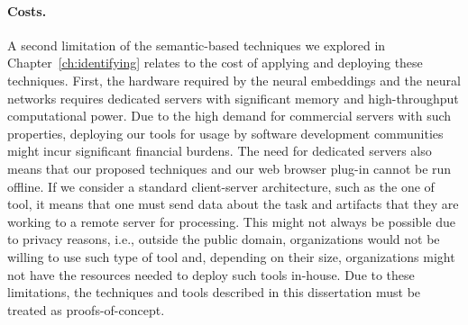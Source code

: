 \paragraph{\textbf{Costs.}}


A second limitation of the semantic-based techniques we explored in Chapter~\ref{ch:identifying}
relates to the cost of applying and deploying these techniques. 
First, the hardware required by 
the neural embeddings and the neural networks
requires dedicated servers with significant 
memory and high-throughput computational power. Due to the high demand for commercial servers with such properties, deploying our tools for usage by software development communities might incur significant financial burdens. 
The need for dedicated servers also means that our proposed techniques and our web browser plug-in cannot be run offline. If we consider a standard client-server architecture, such as the one of \acs{tool}, it means that one must send data about the task and artifacts that they are working to a remote server for processing. This might not always be possible due to privacy reasons, i.e., outside the public domain, organizations would not be willing to use such type of tool and, depending on their size,  organizations might not have the resources needed to deploy such tools in-house. Due to these limitations, the techniques and tools described in this dissertation 
must be treated as proofs-of-concept.

